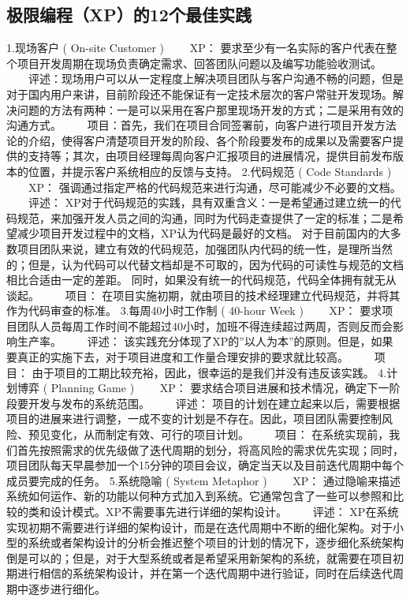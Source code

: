 \documentclass[UTF8]{article}
\begin{document}
\subsection{极限编程（XP）的12个最佳实践}
1.现场客户 ( On-site Customer )
　　XP： 要求至少有一名实际的客户代表在整个项目开发周期在现场负责确定需求、回答团队问题以及编写功能验收测试。
　　评述：现场用户可以从一定程度上解决项目团队与客户沟通不畅的问题，但是对于国内用户来讲，目前阶段还不能保证有一定技术层次的客户常驻开发现场。解决问题的方法有两种：一是可以采用在客户那里现场开发的方式；二是采用有效的沟通方式。
　　项目：首先，我们在项目合同签署前，向客户进行项目开发方法论的介绍，使得客户清楚项目开发的阶段、各个阶段要发布的成果以及需要客户提供的支持等；其次，由项目经理每周向客户汇报项目的进展情况，提供目前发布版本的位置，并提示客户系统相应的反馈与支持。
2.代码规范 ( Code Standards )
　　XP： 强调通过指定严格的代码规范来进行沟通，尽可能减少不必要的文档。
　　评述： XP对于代码规范的实践，具有双重含义：一是希望通过建立统一的代码规范，来加强开发人员之间的沟通，同时为代码走查提供了一定的标准；二是希望减少项目开发过程中的文档，XP认为代码是最好的文档。
对于目前国内的大多数项目团队来说，建立有效的代码规范，加强团队内代码的统一性，是理所当然的；但是，认为代码可以代替文档却是不可取的，因为代码的可读性与规范的文档相比合适由一定的差距。
同时，如果没有统一的代码规范，代码全体拥有就无从谈起。
　　项目： 在项目实施初期，就由项目的技术经理建立代码规范，并将其作为代码审查的标准。
3.每周40小时工作制 ( 40-hour Week )
　　XP： 要求项目团队人员每周工作时间不能超过40小时，加班不得连续超过两周，否则反而会影响生产率。
　　评述： 该实践充分体现了XP的”以人为本”的原则。但是，如果要真正的实施下去，对于项目进度和工作量合理安排的要求就比较高。
　　项目： 由于项目的工期比较充裕，因此，很幸运的是我们并没有违反该实践。
4.计划博弈 ( Planning Game )
　　XP： 要求结合项目进展和技术情况，确定下一阶段要开发与发布的系统范围。
　　评述： 项目的计划在建立起来以后，需要根据项目的进展来进行调整，一成不变的计划是不存在。因此，项目团队需要控制风险、预见变化，从而制定有效、可行的项目计划。
　　项目： 在系统实现前，我们首先按照需求的优先级做了迭代周期的划分，将高风险的需求优先实现；同时，项目团队每天早晨参加一个15分钟的项目会议，确定当天以及目前迭代周期中每个成员要完成的任务。
5.系统隐喻 ( System Metaphor )
　　XP： 通过隐喻来描述系统如何运作、新的功能以何种方式加入到系统。它通常包含了一些可以参照和比较的类和设计模式。XP不需要事先进行详细的架构设计。
　　评述： XP在系统实现初期不需要进行详细的架构设计，而是在迭代周期中不断的细化架构。对于小型的系统或者架构设计的分析会推迟整个项目的计划的情况下，逐步细化系统架构倒是可以的；但是，对于大型系统或者是希望采用新架构的系统，就需要在项目初期进行相信的系统架构设计，并在第一个迭代周期中进行验证，同时在后续迭代周期中逐步进行细化。
\end{document}
